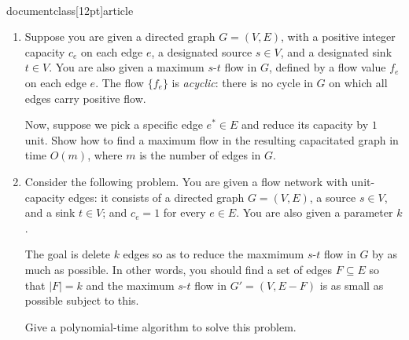 \\documentclass[12pt]{article}
\begin{document}
\begin{enumerate}


\item 

Suppose you are given a directed graph $G = (V,E)$, with
a positive integer capacity $c_e$ on each edge $e$,
a designated source $s \in V$, and a designated sink $t \in V$.
You are also given a maximum $s$-$t$ flow in $G$,
defined by a flow value $f_e$ on each edge $e$.
The flow $\{f_e\}$ is {\em acyclic}: there is
no cycle in $G$ on which all edges carry positive flow.

Now, suppose we pick a specific edge $e^* \in E$
and reduce its capacity by $1$ unit.
Show how to find a maximum flow in the resulting
capacitated graph in time $O(m)$,
where $m$ is the number of edges in $G$.


\item 

Consider the following problem.
You are given a flow network with unit-capacity edges:
it consists of a directed graph $G = (V,E)$, a source $s \in V$,
and a sink $t \in V$; and $c_e = 1$ for every $e \in E$.
You are also given a parameter $k$.

The goal is delete $k$ edges so as to reduce
the maxmimum $s$-$t$ flow in $G$ by as much as possible.
In other words, you should find a set of edges $F \subseteq E$
so that $|F| = k$ and
the maximum $s$-$t$ flow in $G' = (V,E - F)$ is as
small as possible subject to this.

Give a polynomial-time algorithm to solve this problem.

\end{enumerate}
\end{document}
